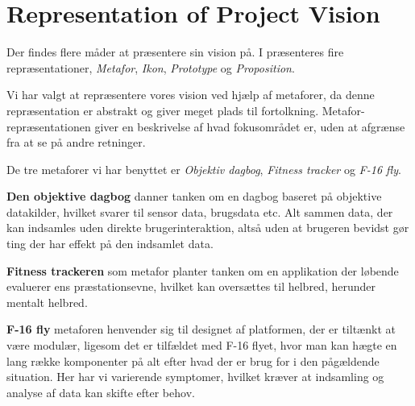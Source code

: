 \section{Representation of Project Vision}
Der findes flere måder at præsentere sin vision på. 
I \citet[Kapitel 24 - Representation]{art:essence} præsenteres fire repræsentationer, \textit{Metafor}, \textit{Ikon}, \textit{Prototype} og \textit{Proposition}.

Vi har valgt at repræsentere vores vision ved hjælp af metaforer, da denne repræsentation er abstrakt og giver meget plads til fortolkning.
Metafor-repræsentationen giver en beskrivelse af hvad fokusområdet er, uden at afgrænse fra at se på andre retninger.

De tre metaforer vi har benyttet er \textit{Objektiv dagbog}, \textit{Fitness tracker} og \textit{F-16 fly}.

\textbf{Den objektive dagbog} danner tanken om en dagbog baseret på objektive datakilder, hvilket svarer til sensor data, brugsdata etc.
Alt sammen data, der kan indsamles uden direkte brugerinteraktion, altså uden at brugeren bevidst gør ting der har effekt på den indsamlet data.

\textbf{Fitness trackeren} som metafor planter tanken om en applikation der løbende evaluerer ens præstationsevne, hvilket kan oversættes til helbred, herunder mentalt helbred.

\textbf{F-16 fly}\label{vision::fly} metaforen henvender sig til designet af platformen, der er tiltænkt at være modulær, ligesom det er tilfældet med F-16 flyet, hvor man kan hægte en lang række komponenter på alt efter hvad der er brug for i den pågældende situation.
Her har vi varierende symptomer, hvilket kræver at indsamling og analyse af data kan skifte efter behov.
